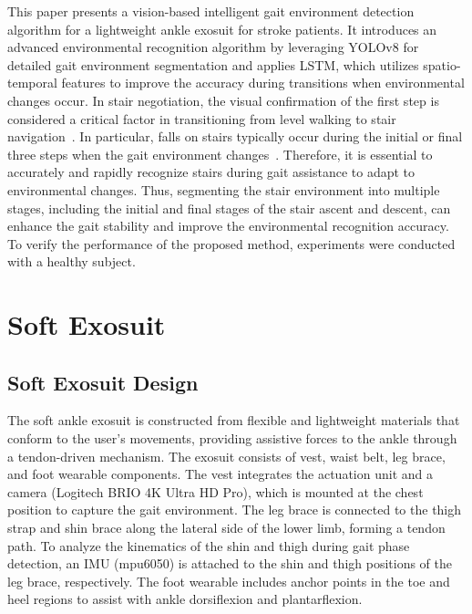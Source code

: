 \documentclass[actuators,article,accept,pdftex,moreauthors]{Definitions/mdpi}
\begin{document}
This paper presents a vision-based intelligent gait environment detection algorithm for a lightweight ankle exosuit for stroke patients. It introduces an advanced environmental recognition algorithm by leveraging {YOLOv8} for detailed gait environment segmentation and applies {LSTM}, which utilizes spatio-temporal features to improve the accuracy during transitions when environmental changes occur.
In stair negotiation, the visual confirmation of the first step is considered a critical factor in transitioning from level walking to stair navigation~\cite{Archea1979}. In particular, falls on stairs typically occur during the initial or final three steps when the gait environment changes~\cite{Templer1995}. Therefore, it is essential to accurately and rapidly recognize stairs during gait assistance to adapt to environmental changes. 
Thus, segmenting the stair environment into multiple stages, including the initial and final stages of the stair ascent and descent, can enhance the gait stability and improve the environmental recognition accuracy.
To verify the performance of the proposed method, experiments were conducted with a healthy subject. 


\section{Soft Exosuit}

\subsection{Soft Exosuit Design}
The soft ankle exosuit is constructed from flexible and lightweight materials that conform to the user's movements, providing assistive forces to the ankle through a tendon-driven mechanism. 
The exosuit consists of vest, waist belt, leg brace, and foot wearable components. The vest integrates the actuation unit and a camera (Logitech BRIO 4K Ultra HD Pro), which is mounted at the chest position to capture the gait environment.
The leg brace is connected to the thigh strap and shin brace along the lateral side of the lower limb, forming a tendon path. To analyze the kinematics of the shin and thigh during gait phase detection, an IMU (mpu6050) is attached to the shin and thigh positions of the leg brace, respectively. The foot wearable includes anchor points in the toe and heel regions to assist with ankle dorsiflexion and plantarflexion.
\end{document}
